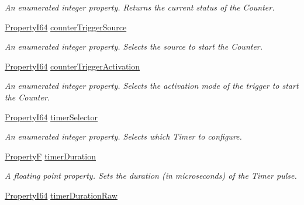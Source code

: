 \begin{DoxyCompactItemize}
\begin{DoxyCompactList}\small\item\em An enumerated integer property. Returns the current status of the Counter. \end{DoxyCompactList}\item 
\hyperlink{group___common_interface_ga81749b2696755513663492664a18a893}{Property\+I64} \hyperlink{classmv_i_m_p_a_c_t_1_1acquire_1_1_gen_i_cam_1_1_counter_and_timer_control_a794668b6daf40a909de1d84fa1408859}{counter\+Trigger\+Source}
\begin{DoxyCompactList}\small\item\em An enumerated integer property. Selects the source to start the Counter. \end{DoxyCompactList}\item 
\hyperlink{group___common_interface_ga81749b2696755513663492664a18a893}{Property\+I64} \hyperlink{classmv_i_m_p_a_c_t_1_1acquire_1_1_gen_i_cam_1_1_counter_and_timer_control_ae3e718076d7c1392e360281172930b4c}{counter\+Trigger\+Activation}
\begin{DoxyCompactList}\small\item\em An enumerated integer property. Selects the activation mode of the trigger to start the Counter. \end{DoxyCompactList}\item 
\hyperlink{group___common_interface_ga81749b2696755513663492664a18a893}{Property\+I64} \hyperlink{classmv_i_m_p_a_c_t_1_1acquire_1_1_gen_i_cam_1_1_counter_and_timer_control_a98aaeada13d3a3f9edc2abfeeba6077e}{timer\+Selector}
\begin{DoxyCompactList}\small\item\em An enumerated integer property. Selects which Timer to configure. \end{DoxyCompactList}\item 
\hyperlink{group___common_interface_gaf54865fe5a3d5cfd15f9a111b40d09f9}{Property\+F} \hyperlink{classmv_i_m_p_a_c_t_1_1acquire_1_1_gen_i_cam_1_1_counter_and_timer_control_a1129d4390fb2db6fc43dea90a16ca32c}{timer\+Duration}
\begin{DoxyCompactList}\small\item\em A floating point property. Sets the duration (in microseconds) of the Timer pulse. \end{DoxyCompactList}\item 
\hyperlink{group___common_interface_ga81749b2696755513663492664a18a893}{Property\+I64} \hyperlink{classmv_i_m_p_a_c_t_1_1acquire_1_1_gen_i_cam_1_1_counter_and_timer_control_ac8814d7bc9581dadc3411ceef2a4cb1e}{timer\+Duration\+Raw}

\end{DoxyCompactItemize}
